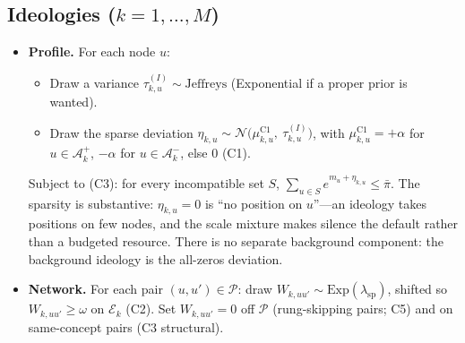 \documentclass[11pt]{article}
\newcommand{\PP}{\mathcal{P}}
\newcommand{\Acal}{\mathcal{A}}
\newcommand{\Ecal}{\mathcal{E}}
\newcommand{\1}{\mathbb{1}}
\begin{document}
\subsection*{Ideologies ($k=1,\dots,M$)}
\begin{itemize}
  \item \textbf{Profile.} For each node $u$:
  \begin{itemize}
    \item Draw a variance $\tau^{(I)}_{k,u}\sim\text{Jeffreys}$ (Exponential if a proper prior is wanted).
    \item Draw the sparse deviation $\eta_{k,u}\sim\mathcal{N}\big(\mu^{\text{C1}}_{k,u},\ \tau^{(I)}_{k,u}\big)$, with $\mu^{\text{C1}}_{k,u}=+\alpha$ for $u\in\Acal^+_k$, $-\alpha$ for $u\in\Acal^-_k$, else $0$ (C1).
  \end{itemize}
  Subject to (C3): for every incompatible set $S$, $\sum_{u\in S}e^{m_u+\eta_{k,u}}\le\bar\pi$. The sparsity is substantive: $\eta_{k,u}=0$ is ``no position on $u$''---an ideology takes positions on few nodes, and the scale mixture makes silence the default rather than a budgeted resource. There is no separate background component: the background ideology is the all-zeros deviation.
  \item \textbf{Network.} For each pair $(u,u')\in\PP$: draw $W_{k,uu'}\sim\text{Exp}(\lambda_{\text{sp}})$, shifted so $W_{k,uu'}\ge\omega$ on $\Ecal_k$ (C2). Set $W_{k,uu'}=0$ off $\PP$ (rung-skipping pairs; C5) and on same-concept pairs (C3 structural).
\end{itemize}
\end{document}
